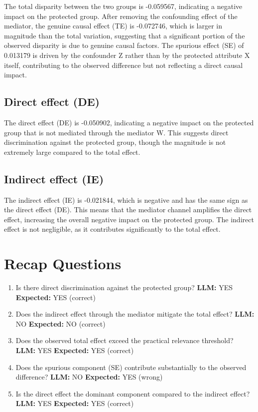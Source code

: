 \documentclass[11pt]{article}
\begin{document}
The total disparity between the two groups is -0.059567, indicating a negative impact on the protected group. After removing the confounding effect of the mediator, the genuine causal effect (TE) is -0.072746, which is larger in magnitude than the total variation, suggesting that a significant portion of the observed disparity is due to genuine causal factors. The spurious effect (SE) of 0.013179 is driven by the confounder Z rather than by the protected attribute X itself, contributing to the observed difference but not reflecting a direct causal impact.

\subsection{Direct effect (DE)}

The direct effect (DE) is -0.050902, indicating a negative impact on the protected group that is not mediated through the mediator W. This suggests direct discrimination against the protected group, though the magnitude is not extremely large compared to the total effect.

\subsection{Indirect effect (IE)}

The indirect effect (IE) is -0.021844, which is negative and has the same sign as the direct effect (DE). This means that the mediator channel amplifies the direct effect, increasing the overall negative impact on the protected group. The indirect effect is not negligible, as it contributes significantly to the total effect.

\section{Recap Questions}

\begin{enumerate}
\item Is there direct discrimination against the protected group? \textbf{LLM:} YES \quad \textbf{Expected:} YES \quad (correct)
\item Does the indirect effect through the mediator mitigate the total effect? \textbf{LLM:} NO \quad \textbf{Expected:} NO \quad (correct)
\item Does the observed total effect exceed the practical relevance threshold? \textbf{LLM:} YES \quad \textbf{Expected:} YES \quad (correct)
\item Does the spurious component (SE) contribute substantially to the observed difference? \textbf{LLM:} NO \quad \textbf{Expected:} YES \quad (wrong)
\item Is the direct effect the dominant component compared to the indirect effect? \textbf{LLM:} YES \quad \textbf{Expected:} YES \quad (correct)
\end{enumerate}
\end{document}

